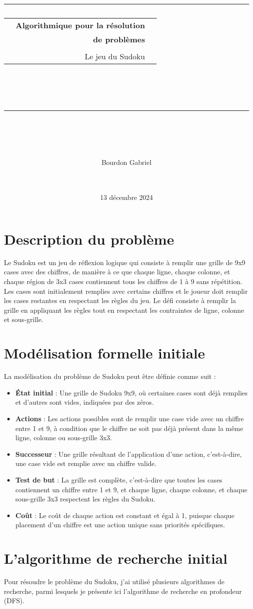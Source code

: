 \documentclass{article}
\date{13 décembre 2024}
\title{
{\rule{\larg}{1mm}}\vspace{5mm}
\begin{tabular}{p{1cm} r c}
   & {\huge \textbf{Algorithmique pour la résolution}} \\
   & {\huge \textbf{de problèmes}} \\
   & \\
   &{\huge Le jeu du Sudoku}
\end{tabular}\\
\vspace{2mm}
{\rule{\larg}{1mm}}
\vspace{2mm} \\
}
\author{\begin{tabular}{p{13.7cm}}
Bourdon Gabriel
\end{tabular}\\
\\ }\medskip
\begin{document}
\maketitle
\newpage
\tableofcontents
\newpage

\section{Description du problème}
Le Sudoku est un jeu de réflexion logique qui consiste à remplir une grille de 9x9 cases avec des chiffres, de manière à ce que chaque ligne, chaque colonne, et chaque région de 3x3 cases contiennent tous les chiffres de 1 à 9 sans répétition. Les cases sont initialement remplies avec certains chiffres et le joueur doit remplir les cases restantes en respectant les règles du jeu. Le défi consiste à remplir la grille en appliquant les règles tout en respectant les contraintes de ligne, colonne et sous-grille.

\section{Modélisation formelle initiale}
La modélisation du problème de Sudoku peut être définie comme suit :
\begin{itemize}
    \item \textbf{État initial} : Une grille de Sudoku 9x9, où certaines cases sont déjà remplies et d'autres sont vides, indiquées par des zéros.
    \item \textbf{Actions} : Les actions possibles sont de remplir une case vide avec un chiffre entre 1 et 9, à condition que le chiffre ne soit pas déjà présent dans la même ligne, colonne ou sous-grille 3x3.
    \item \textbf{Successeur} : Une grille résultant de l'application d'une action, c'est-à-dire, une case vide est remplie avec un chiffre valide.
    \item \textbf{Test de but} : La grille est complète, c'est-à-dire que toutes les cases contiennent un chiffre entre 1 et 9, et chaque ligne, chaque colonne, et chaque sous-grille 3x3 respectent les règles du Sudoku.
    \item \textbf{Coût} : Le coût de chaque action est constant et égal à 1, puisque chaque placement d'un chiffre est une action unique sans priorités spécifiques.
\end{itemize}

\section{L'algorithme de recherche initial}
Pour résoudre le problème du Sudoku, j'ai utilisé plusieurs algorithmes de recherche, parmi lesquels je présente ici l'algorithme de recherche en profondeur (DFS).
\end{document}
